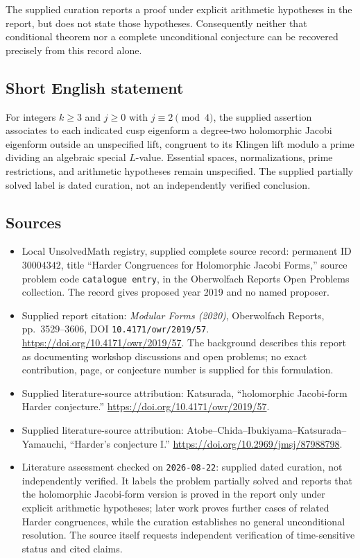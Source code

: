 \documentclass[11pt]{article}
\begin{document}
The supplied curation reports a proof under explicit arithmetic hypotheses in the report, but does not state those hypotheses. Consequently neither that conditional theorem nor a complete unconditional conjecture can be recovered precisely from this record alone.
\subsection{Short English statement}
For integers \(k\geq3\) and \(j\geq0\) with \(j\equiv2\pmod4\), the supplied assertion associates to each indicated cusp eigenform a degree-two holomorphic Jacobi eigenform outside an unspecified lift, congruent to its Klingen lift modulo a prime dividing an algebraic special \(L\)-value. Essential spaces, normalizations, prime restrictions, and arithmetic hypotheses remain unspecified. The supplied partially solved label is dated curation, not an independently verified conclusion.
\subsection{Sources}
\begin{itemize}
\item Local UnsolvedMath registry, supplied complete source record: permanent ID \(30004342\), title ``Harder Congruences for Holomorphic Jacobi Forms,'' source problem code \texttt{catalogue entry}, in the Oberwolfach Reports Open Problems collection. The record gives proposed year 2019 and no named proposer.
\item Supplied report citation: \emph{Modular Forms (2020)}, Oberwolfach Reports, pp.\ 3529--3606, DOI \texttt{10.4171/owr/2019/57}. \url{https://doi.org/10.4171/owr/2019/57}. The background describes this report as documenting workshop discussions and open problems; no exact contribution, page, or conjecture number is supplied for this formulation.
\item Supplied literature-source attribution: Katsurada, ``holomorphic Jacobi-form Harder conjecture.'' \url{https://doi.org/10.4171/owr/2019/57}.
\item Supplied literature-source attribution: Atobe--Chida--Ibukiyama--Katsurada--Yamauchi, ``Harder's conjecture I.'' \url{https://doi.org/10.2969/jmsj/87988798}.
\item Literature assessment checked on \texttt{2026-08-22}: supplied dated curation, not independently verified. It labels the problem partially solved and reports that the holomorphic Jacobi-form version is proved in the report only under explicit arithmetic hypotheses; later work proves further cases of related Harder congruences, while the curation establishes no general unconditional resolution. The source itself requests independent verification of time-sensitive status and cited claims.
\end{itemize}
\end{document}
